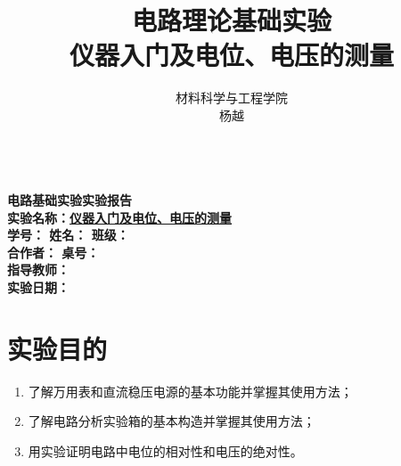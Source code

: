 \documentclass[a4paper]{article}
\title{{\bfseries 电路理论基础实验} \\ \zihao{4}\songti 仪器入门及电位、电压的测量}
\author{材料科学与工程学院\\ 杨越\quad 22301071}
\date{}
\begin{document}
\begin{center}
    {\mbox{}\\[7em]\bfseries\songti%
    电路基础实验实验报告}\\[34mm]
    {\bfseries\songti
    实验名称：\uline{\hfill\mbox{仪器入门及电位、电压的测量}\hfill} \\[2.9mm]
    学\quad 号：\uline{}\hfill
    姓\quad 名：\uline{}\hfill
    班\quad 级：\uline{} \\[2.9mm]
    合作者：\uline{}\hspace*{7.4mm}
    桌\quad 号：\uline{}\hfill\mbox{}\\[2.9mm]
    指导教师：\uline{}\hfill\mbox{} \\[2.9mm]
    实验日期：\uline{}\hfill\mbox{} \\[58.7mm]

    }
\end{center}
\newpage

\section{实验目的}

\begin{enumerate}
    \item 了解万用表和直流稳压电源的基本功能并掌握其使用方法；
    \item 了解电路分析实验箱的基本构造并掌握其使用方法；
    \item 用实验证明电路中电位的相对性和电压的绝对性。
\end{enumerate}
\end{document}
